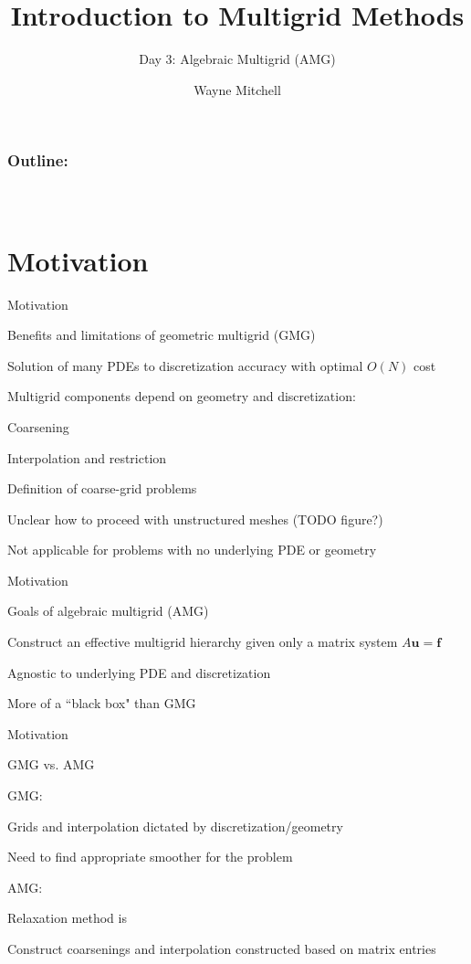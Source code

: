 \documentclass[18pt,xcolor=table]{beamer}
\title[Multigrid]{Introduction to Multigrid Methods}
\subtitle{Day 3: Algebraic Multigrid (AMG)}
\author[Mitchell]{Wayne Mitchell}
\institute{\pgfuseimage{logo}\\Universit\"at Heidelberg\\Institut f\"ur Technische Informatik}
\date[]{\alert{}}
\begin{document}


\DeclareRobustCommand{\Chi}{\raisebox{2pt}{$\chi$}}

\begin{frame}
\frametitle{\bf Outline:}
\framesubtitle{~~}
\tableofcontents
\end{frame}


\section{Motivation}

\begin{frame}{Motivation}
\begin{block}{Benefits and limitations of geometric multigrid (GMG)}
\bit
\item Solution of many PDEs to discretization accuracy with optimal $O(N)$ cost
\item Multigrid components depend on geometry and discretization:
\bit
\item Coarsening
\item Interpolation and restriction
\item Definition of coarse-grid problems
\eit
\item Unclear how to proceed with unstructured meshes (TODO figure?)
\item Not applicable for problems with no underlying PDE or geometry
\eit
\end{block}
\end{frame}

\begin{frame}{Motivation}
\begin{block}{Goals of algebraic multigrid (AMG)}
\bit
\item Construct an effective multigrid hierarchy given only a matrix system $A\mathbf{u} = \mathbf{f}$
\item Agnostic to underlying PDE and discretization
\item More of a ``black box" than GMG
\eit
\end{block}
\end{frame}

\begin{frame}{Motivation}
\begin{block}{GMG vs. AMG}
\bit
\item GMG:
\bit
\item Grids and interpolation dictated by discretization/geometry
\item Need to find appropriate smoother for the problem
\eit
\item AMG:
\bit
\item Relaxation method is 
\item Construct coarsenings and interpolation constructed based on matrix entries
\eit
\eit
\end{block}
\end{frame}
\end{document}
